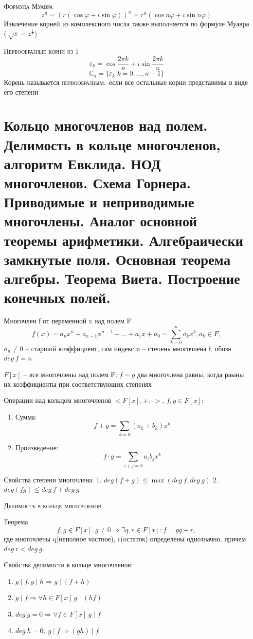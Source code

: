 \documentclass{article}
\begin{document}
\textsc{Формула Муавра}
$$z^n=(r(\cos\varphi+i\sin\varphi))^n=r^n(\cos n\varphi+i\sin n\varphi)$$
Извлечение корней из комплексного числа также выполняется по формуле Муавра ($\sqrt[n]{z}=z^{\frac{1}{n}}$)

\textsc{Первообразные корни из 1}
$$\varepsilon_k=\cos\frac{2\pi k}{n}+i\sin\frac{2\pi k}{n}$$
$$\mathbb{C}_n=\{\varepsilon_k|k=0,\dots,n-1\}$$
Корень называется \textsc{первообразным}, если все остальные корни представимы в виде его степени

\section{Кольцо многочленов над полем. Делимость в кольце многочленов, алгоритм Евклида. НОД многочленов. Схема Горнера. Приводимые и неприводимые многочлены. Аналог основной теоремы арифметики. Алгебраически замкнутые поля. Основная теорема алгебры. Теорема Виета. Построение конечных полей.}
Многочлен f от переменной x над полем F
$$f(x)=a_nx^n+a_{n-1}x^{n-1}+\dots+a_1x+a_0=\sum^n_{k=0}a_kx^k, a_k\in F,$$
$a_n\neq 0$ – старший коэффициент, сам индекс n – степень многочлена f, обозн $deg\ f=n$

$F[x]$ – все многочлены над полем F; $f=g$ два многочлена равны, когда раыны их коэффициенты при соответствующих степенях

Операции над кольцом многочленов $<F[x], +, \cdot>$, $f,g\in F[x]$:
\begin{enumerate}
    \item Сумма: $$f+g=\sum_{k=0}(a_k+b_k)x^k$$
    \item Произведение: $$f\cdot g=\sum_{i+j=k}a_ib_jx^k$$
\end{enumerate}

Свойства степени многочлена: 1. $deg (f+g)\leq \max(deg\ f, deg\ g)$ 2. $deg (fg)\leq deg\ f+deg\ g$

\textsc{Делимость в кольце многочленов}

Теорема 
$$f, g\in F[x], g\neq 0\Rightarrow\exists q, r\in F[x]\colon f=gq+r,$$
где многочлены q(неполное частное), r(остаток) определены однозначно, причем $deg\ r<deg\ g$.

Свойства делимости в кольце многочленов:
\begin{enumerate}
    \item $g\mid f, g\mid h \Rightarrow g\mid (f+h)$
    \item $g\mid f\Rightarrow \forall h\in F[x]\ g\mid (hf)$
    \item $deg\ g=0\Rightarrow \forall f\in F[x]\ g\mid f$
    \item $deg\ h=0,\ g\mid f\Rightarrow (gh)\mid f$
\end{enumerate}
\end{document}
